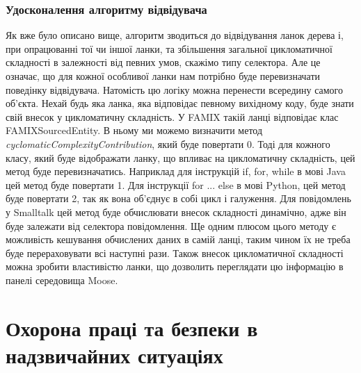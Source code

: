 \documentclass[12pt,a4paper]{article}
\begin{document}
\subsubsection{Удосконалення алгоритму відвідувача}
Як вже було описано вище, алгоритм зводиться до відвідування ланок дерева і, при опрацюванні тої чи іншої ланки, та збільшення загальної цикломатичної складності в залежності від певних умов, скажімо типу селектора. Але це означає, що для кожної особливої ланки нам потрібно буде перевизначати поведінку відвідувача. Натомість цю логіку можна перенести всередину самого об'єкта. Нехай будь яка ланка, яка відповідає певному вихідному коду, буде знати свій внесок у цикломатичну складність. У FAMIX такій ланці відповідає клас FAMIXSourcedEntity. В ньому ми можемо визначити метод \emph{cyclomaticComplexityContribution}, який буде повертати 0. Тоді для кожного класу, який буде відображати ланку, що впливає на цикломатичну складність, цей метод буде перевизначатись. Наприклад для інструкцій if, for, while в мові Java цей метод буде повертати 1. Для інструкції for ... else в мові Python, цей метод буде повертати 2, так як вона об'єднує в собі цикл і галуження. Для повідомлень у Smalltalk цей метод буде обчислювати внесок складності динамічно, адже він буде залежати від селектора повідомлення. Ще одним плюсом цього методу є можливість кешування обчислених даних в самій ланці, таким чином їх не треба буде перераховувати всі наступні рази. Також внесок цикломатичної складності можна зробити властивістю ланки, що дозволить переглядати цю інформацію в панелі середовища Moose.

\clearpage

\section{Охорона праці та безпеки в надзвичайних ситуаціях}
\end{document}
